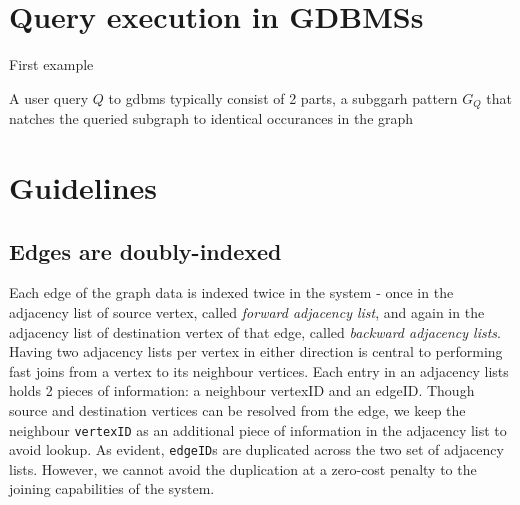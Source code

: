 \section{Query execution in GDBMSs}
\label{sec:operators}

	First example


A user query $Q$ to \gls{gdbms} typically consist of 2 parts, 
a subggarh pattern $G_Q$ that natches the queried subgraph to identical occurances in the graph

\section{Guidelines}
\label{sec:guidelines}



\subsection{Edges are doubly-indexed}
Each edge of the graph data is indexed twice in the system - once in the adjacency list of source vertex, called \emph{forward adjacency list}, and again in the adjacency list of destination vertex of that edge, called \emph{backward adjacency lists}. Having two adjacency lists per vertex in either direction is central to performing fast joins from a vertex to its neighbour vertices. Each entry in an adjacency lists holds 2 pieces of information: a neighbour vertexID and an edgeID. Though source and destination vertices can be resolved from the edge, we keep the neighbour \texttt{vertexID} as an additional piece of information in the adjacency list to avoid lookup. As evident, \texttt{edgeID}s are duplicated across the two set of adjacency lists. However, we cannot avoid the duplication at a zero-cost penalty to the joining capabilities of the system.

